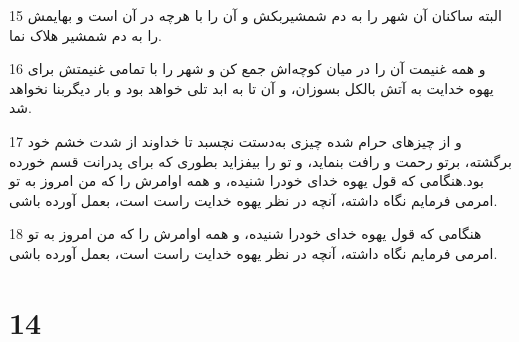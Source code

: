 \par 15 البته ساکنان آن شهر را به دم شمشیربکش و آن را با هرچه در آن است و بهایمش را به دم شمشیر هلاک نما.
\par 16 و همه غنیمت آن را در میان کوچه‌اش جمع کن و شهر را با تمامی غنیمتش برای یهوه خدایت به آتش بالکل بسوزان، و آن تا به ابد تلی خواهد بود و بار دیگربنا نخواهد شد.
\par 17 و از چیزهای حرام شده چیزی به‌دستت نچسبد تا خداوند از شدت خشم خود برگشته، برتو رحمت و رافت بنماید، و تو را بیفزاید بطوری که برای پدرانت قسم خورده بود.هنگامی که قول یهوه خدای خودرا شنیده، و همه اوامرش را که من امروز به تو امرمی فرمایم نگاه داشته، آنچه در نظر یهوه خدایت راست است، بعمل آورده باشی.
\par 18 هنگامی که قول یهوه خدای خودرا شنیده، و همه اوامرش را که من امروز به تو امرمی فرمایم نگاه داشته، آنچه در نظر یهوه خدایت راست است، بعمل آورده باشی.
 
\chapter{14}

